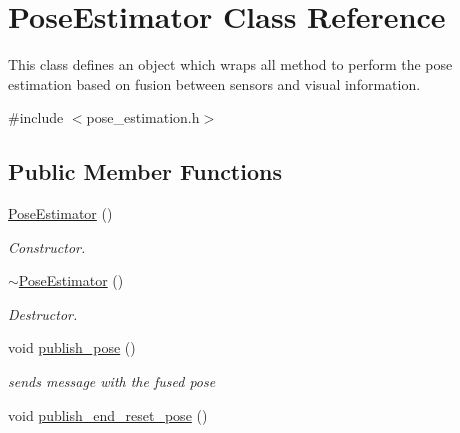 \hypertarget{classPoseEstimator}{}\section{Pose\+Estimator Class Reference}
\label{classPoseEstimator}


This class defines an object which wraps all method to perform the pose estimation based on fusion between sensors and visual information.  




{\ttfamily \#include $<$pose\+\_\+estimation.\+h$>$}

\subsection*{Public Member Functions}
\begin{DoxyCompactItemize}
\item 
\mbox{\label{classPoseEstimator_a323752971558cbf1c2ab605655cdf120}} 
\hyperlink{classPoseEstimator_a323752971558cbf1c2ab605655cdf120}{Pose\+Estimator} ()
\begin{DoxyCompactList}\small\item\em Constructor. \end{DoxyCompactList}\item 
\mbox{\label{classPoseEstimator_a9a39dc735c4f07db843f5d69859254b4}} 
\hyperlink{classPoseEstimator_a9a39dc735c4f07db843f5d69859254b4}{$\sim$\+Pose\+Estimator} ()
\begin{DoxyCompactList}\small\item\em Destructor. \end{DoxyCompactList}\item 
\mbox{\label{classPoseEstimator_ae2f5e526cec1efe55d784e9a403176cb}} 
void \hyperlink{classPoseEstimator_ae2f5e526cec1efe55d784e9a403176cb}{publish\+\_\+pose} ()
\begin{DoxyCompactList}\small\item\em sends message with the fused pose \end{DoxyCompactList}\item 
\mbox{\label{classPoseEstimator_a00ac39efb220483e62f4adb359d0f997}} 
void \hyperlink{classPoseEstimator_a00ac39efb220483e62f4adb359d0f997}{publish\+\_\+end\+\_\+reset\+\_\+pose} ()

\end{DoxyCompactItemize}

